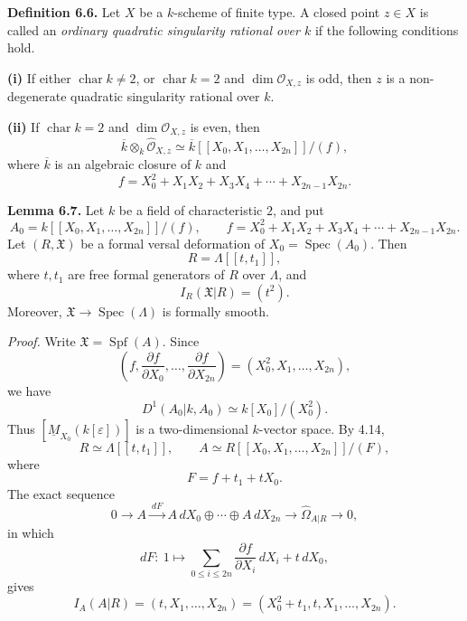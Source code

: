 
\par\medskip
\noindent\textbf{Definition 6.6.}
Let $X$ be a $k$-scheme of finite type. A closed point $z\in X$ is
called an \emph{ordinary quadratic singularity rational over $k$} if
the following conditions hold.

\smallskip
\noindent\textbf{(i)} If either $\operatorname{char}k\neq2$, or
$\operatorname{char}k=2$ and $\dim\mathcal O_{X,z}$ is odd, then $z$
is a non-degenerate quadratic singularity rational over $k$.

\smallskip
\noindent\textbf{(ii)} If $\operatorname{char}k=2$ and
$\dim\mathcal O_{X,z}$ is even, then
\[
\overline k\otimes_k\widehat{\mathcal O}_{X,z}
 \simeq
\overline k[[X_0,X_1,\ldots,X_{2n}]]/(f),
\]
where $\overline k$ is an algebraic closure of $k$ and
\[
f=X_0^2+X_1X_2+X_3X_4+\cdots+X_{2n-1}X_{2n}.
\]

\par\medskip
\noindent\textbf{Lemma 6.7.}
Let $k$ be a field of characteristic $2$, and put
\[
A_0=k[[X_0,X_1,\ldots,X_{2n}]]/(f),
\qquad
f=X_0^2+X_1X_2+X_3X_4+\cdots+X_{2n-1}X_{2n}.
\]
Let $(R,\mathfrak X)$ be a formal versal deformation of
$X_0=\operatorname{Spec}(A_0)$. Then
\[
R=\Lambda[[t,t_1]],
\]
where $t,t_1$ are free formal generators of $R$ over $\Lambda$, and
\[
I_R(\mathfrak X|R)=(t^2).
\]
Moreover,
$\mathfrak X\longrightarrow\operatorname{Spec}(\Lambda)$ is formally
smooth.

\smallskip
\noindent\textit{Proof.}
Write $\mathfrak X=\operatorname{Spf}(A)$. Since
\[
\left(f,\frac{\partial f}{\partial X_0},\ldots,
         \frac{\partial f}{\partial X_{2n}}\right)
=(X_0^2,X_1,\ldots,X_{2n}),
\]
we have
\[
D^1(A_0|k,A_0)\simeq k[X_0]/(X_0^2).
\]
Thus $[\underline M_{X_0}(k[\varepsilon])]$ is a two-dimensional
$k$-vector space. By 4.14,
\[
R\simeq\Lambda[[t,t_1]],
\qquad
A\simeq R[[X_0,X_1,\ldots,X_{2n}]]/(F),
\]
where
\[
F=f+t_1+tX_0.
\]
The exact sequence
\[
0\longrightarrow A\xrightarrow{\ dF\ }
A\,dX_0\oplus\cdots\oplus A\,dX_{2n}
\longrightarrow\widehat\Omega_{A|R}\longrightarrow0,
\]
in which
\[
dF:\ 1\longmapsto
\sum_{0\leq i\leq2n}\frac{\partial f}{\partial X_i}\,dX_i
+t\,dX_0,
\]
gives
\[
I_A(A|R)
=(t,X_1,\ldots,X_{2n})
=(X_0^2+t_1,t,X_1,\ldots,X_{2n}).
\]


